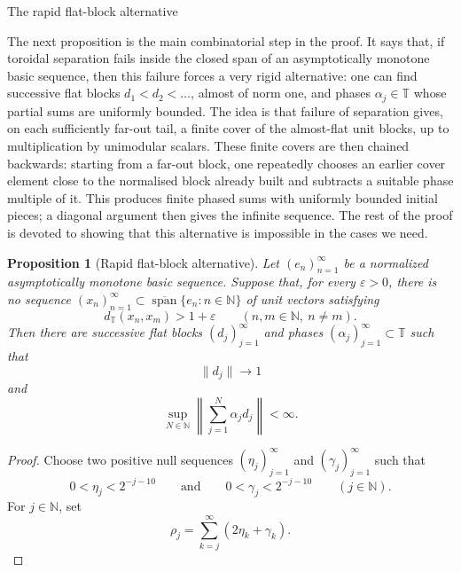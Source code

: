 \documentclass[11pt,reqno]{amsart}
\makeatletter
\theoremstyle{plain}
\newtheorem{proposition}[proposition]{Proposition}
\theoremstyle{definition}
\newcommand{\N}{\mathbb N}
\newcommand{\T}{\mathbb T}
\newcommand{\eps}{\varepsilon}
\newcommand{\distT}{d_{\mathbb T}}
\newcommand{\spancl}[1]{\overline{\operatorname{span}}\{#1\}}
\newcounter{problempaper}
\newenvironment{problempaperbody}{%
  \setcounter{subsection}{0}%
  \setcounter{subsubsection}{0}%
  \setcounter{paragraph}{0}%
  \renewcommand{\thesubsection}{\arabic{subsection}}%
  \renewcommand{\thesubsubsection}{\thesubsection.\arabic{subsubsection}}%
  \renewcommand{\theparagraph}{\thesubsubsection.\arabic{paragraph}}%
  \let\problem@outersection\section
  \let\problem@outersubsection\subsection
  \let\problem@outersubsubsection\subsubsection
  \let\problem@outerparagraph\paragraph
  \let\section\problem@papersection
  \let\subsection\problem@papersubsection
  \let\subsubsection\problem@papersubsubsection
}{%
  \let\section\problem@outersection
  \let\subsection\problem@outersubsection
  \let\subsubsection\problem@outersubsubsection
  \let\paragraph\problem@outerparagraph
}
\newcommand{\problem@target}[2]{%
  \hypertarget{problem-\theproblempaper-#1-#2}{}%
}
\newcommand{\problem@paperheading}[3]{%
  \par\bigskip
  \problem@target{#1}{#2}%
  \noindent{\large\bfseries #2.\quad #3\par}%
  \nobreak\smallskip
}
\newcommand{\problem@papersubheading}[3]{%
  \par\medskip
  \problem@target{#1}{#2}%
  \noindent{\normalsize\bfseries #2.\quad #3\par}%
  \nobreak\smallskip
}
\newcommand{\problem@papersubsubheading}[3]{%
  \par\smallskip
  \problem@target{#1}{#2}%
  \noindent{\normalsize\itshape #2.\quad #3.\ }%
}
\def\problem@papersection{%
  \@ifstar{\problem@papersectionstar}{\problem@papersectionnostar}%
}
\def\problem@papersectionstar#1{%
  \par\bigskip\noindent{\large\bfseries #1\par}\nobreak\smallskip
}
\def\problem@papersectionnostar#1{%
  \refstepcounter{subsection}%
  \setcounter{subsubsection}{0}%
  \setcounter{paragraph}{0}%
  \problem@paperheading{section}{\thesubsection}{#1}%
  \problem@writecontentsline{section}{\thesubsection}{#1}%
}
\def\problem@papersubsection{%
  \@ifstar{\problem@papersubsectionstar}{\problem@papersubsectionnostar}%
}
\def\problem@papersubsectionstar#1{%
  \par\medskip\noindent{\normalsize\bfseries #1\par}\nobreak\smallskip
}
\def\problem@papersubsectionnostar#1{%
  \refstepcounter{subsubsection}%
  \setcounter{paragraph}{0}%
  \problem@papersubheading{subsection}{\thesubsubsection}{#1}%
  \problem@writecontentsline{subsection}{\thesubsubsection}{#1}%
}
\def\problem@papersubsubsection{%
  \@ifstar{\problem@papersubsubsectionstar}{\problem@papersubsubsectionnostar}%
}
\def\problem@papersubsubsectionstar#1{%
  \par\smallskip\noindent{\normalsize\itshape #1.\ }%
}
\def\problem@papersubsubsectionnostar#1{%
  \refstepcounter{paragraph}%
  \problem@papersubsubheading{subsubsection}{\theparagraph}{#1}%
  \problem@writecontentsline{subsubsection}{\theparagraph}{#1}%
}
\newcommand{\problem@writecontentsline}[3]{%
  \begingroup
  \protected@write\@auxout{}{%
    \string\problemcontentsentry{\theproblempaper}{#1}{#2}{#3}{\thepage}%
  }%
  \endgroup
}
\newcommand{\problemcontentsentry}[5]{%
  \@ifundefined{problemcontents@#1}{%
    \expandafter\gdef\csname problemcontents@#1\endcsname{}%
  }{}%
  \expandafter\g@addto@macro\csname problemcontents@#1\endcsname{%
    \problemcontentsline{#1}{#2}{#3}{#4}{#5}%
  }%
}
\newcommand{\problemcontentslink}[4]{%
  \hyperlink{problem-#1-#2-#3}{#4}%
}
\newcommand{\problemcontentsline}[5]{%
  \ifstrequal{#2}{section}{%
    \par\noindent
    \problemcontentslink{#1}{#2}{#3}{\makebox[2.5em][l]{#3}#4}%
    \nobreak\dotfill
    \problemcontentslink{#1}{#2}{#3}{#5}\par
  }{%
    \ifstrequal{#2}{subsection}{%
      \par\noindent\hspace*{1.5em}%
      \problemcontentslink{#1}{#2}{#3}{\makebox[3.5em][l]{#3}#4}%
      \nobreak\dotfill
      \problemcontentslink{#1}{#2}{#3}{#5}\par
    }{%
      \par\noindent\hspace*{3em}%
      \problemcontentslink{#1}{#2}{#3}{\makebox[4.5em][l]{#3}#4}%
      \nobreak\dotfill
      \problemcontentslink{#1}{#2}{#3}{#5}\par
    }%
  }%
}
\makeatother
\begin{document}
\begin{problempaperbody}
\section{The rapid flat-block alternative}\label{p1-first:sec:rapid-flat-block-alternative}

The next proposition is the main combinatorial step in the proof. It says that, if toroidal separation fails inside the closed span of an asymptotically monotone basic sequence, then this failure forces a very rigid alternative: one can find successive flat blocks $d_1<d_2<\ldots$, almost of norm one, and phases $\alpha_j\in\T$ whose partial sums are uniformly bounded. The idea is that failure of separation gives, on each sufficiently far-out tail, a finite cover of the almost-flat unit blocks, up to multiplication by unimodular scalars. These finite covers are then chained backwards: starting from a far-out block, one repeatedly chooses an earlier cover element close to the normalised block already built and subtracts a suitable phase multiple of it. This produces finite phased sums with uniformly bounded initial pieces; a diagonal argument then gives the infinite sequence. The rest of the proof is devoted to showing that this alternative is impossible in the cases we need.

\begin{proposition}[Rapid flat-block alternative]
\label{p1-first:prop:rapid}
Let $(e_n)_{n=1}^{\infty}$ be a normalized asymptotically monotone basic sequence. Suppose that, for every $\eps>0$, there is no sequence $(x_n)_{n=1}^{\infty}\subset \spancl{e_n:n\in\N}$ of unit vectors satisfying
\begin{equation*}
        \distT(x_n,x_m)>1+\eps \qquad(n,m\in\N,\ n\ne m).
\end{equation*}
Then there are successive flat blocks $(d_j)_{j=1}^{\infty}$ and phases $(\alpha_j)_{j=1}^{\infty}\subset\T$ such that
\begin{equation*}
        \|d_j\|\longrightarrow 1
\end{equation*}
and
\begin{equation*}
        \sup_{N\in\N}\left\|\sum_{j=1}^{N}\alpha_jd_j\right\|<\infty.
\end{equation*}
\end{proposition}

\begin{proof}
Choose two positive null sequences $(\eta_j)_{j=1}^{\infty}$ and $(\gamma_j)_{j=1}^{\infty}$ such that
\begin{equation*}
        0<\eta_j<2^{-j-10}
        \qquad\text{and}\qquad
        0<\gamma_j<2^{-j-10}
        \qquad(j\in\N).
\end{equation*}
For $j\in\N$, set
\begin{equation*}
        \rho_j=\sum_{k=j}^{\infty}(2\eta_k+\gamma_k).
\end{equation*}


\end{proof}
\end{problempaperbody}
\end{document}
